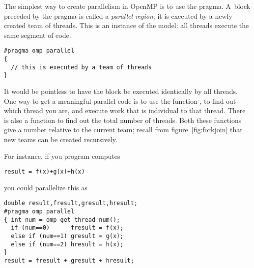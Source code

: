 
\label{sec:parallelregion}

The simplest way to create parallelism in OpenMP is to use
the  pragma. A~block preceded by the  pragma
is called a \emph{parallel region}; it
is executed by a newly created team of threads. 
This is an instance of the  model: all threads execute the same
segment of code.
\begin{verbatim}
#pragma omp parallel
{
  // this is executed by a team of threads
}
\end{verbatim}
It would be pointless to have the block be executed identically by
all threads. One way to get a meaningful parallel code is to use the function
, to find out which thread you are,
and execute work that is individual to that thread.
There is also a function
 to find out the total number of threads.
Both these functions give a number relative to the current team;
recall from figure~\ref{fig:forkjoin} that new teams can be created recursively.

For instance, if you program computes
\begin{verbatim}
result = f(x)+g(x)+h(x)
\end{verbatim}
you could parallelize this as
\begin{verbatim}
double result,fresult,gresult,hresult;
#pragma omp parallel
{ int num = omp_get_thread_num();
  if (num==0)      fresult = f(x);
  else if (num==1) gresult = g(x);
  else if (num==2) hresult = h(x);
}
result = fresult + gresult + hresult;
\end{verbatim}



